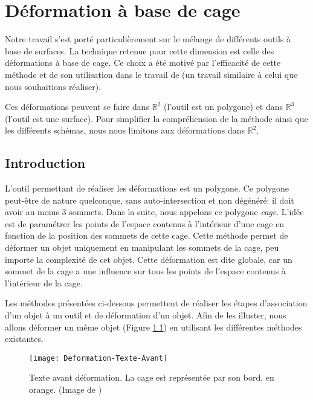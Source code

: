 

\chapter{Déformation à base de cage}

\graphicspath{ {Chapter2/Chapter2Figs/PNG/}
  {Chapter2/Chapter2Figs/PDF/} {Chapter2/Chapter2Figs/} }

Notre travail s'est porté particulièrement sur le mélange de différents outils
à base de surfaces. La technique retenue pour cette dimension est celle des
déformations à base de cage. Ce choix a été motivé par l'efficacité de cette
méthode et de son utilisation dans le travail de \cite{GPCP13} (un travail
similaire à celui que nous souhaitions réaliser).

Ces déformations peuvent se faire dans $\mathbb{R}^2$ (l'outil est un
polygone) et dans $\mathbb{R}^3$ (l'outil est une surface). Pour simplifier la
compréhension de la méthode ainsi que les différents schémas, nous nous
limitons aux déformations dans $\mathbb{R}^2$.

\section{Introduction} 

L'outil permettant de réaliser les déformations est un polygone. Ce polygone
peut-être de nature quelconque, sans auto-intersection et non dégénéré: il
doit avoir au moins 3 sommets. Dans la suite, nous appelons ce polygone
\textit{cage}. L'idée est de paramétrer les points de l'espace contenus à
l'intérieur d'une cage en fonction de la position des sommets de cette cage.
Cette méthode permet de déformer un objet uniquement en manipulant les sommets
de la cage, peu importe la complexité de cet objet. Cette déformation est dite
globale, car un sommet de la cage a une influence sur tous les points de
l'espace contenus à l'intérieur de la cage.

Les méthodes présentées ci-dessous permettent de réaliser les étapes
d'association d'un objet à un outil et de déformation d'un objet. Afin de les
illuster, nous allons déformer un même objet (Figure \ref{DEFAva}) en
utilisant les différentes méthodes existantes.

\begin{figure}[ht]
\begin{center}
\texttt{[image: Deformation-Texte-Avant]}

\caption[Texte avant déformation] {Texte avant déformation. La cage est
représentée par son bord, en orange. (Image de \cite{LLC08})}

\label{DEFAva}
\end{center}
\end{figure}

